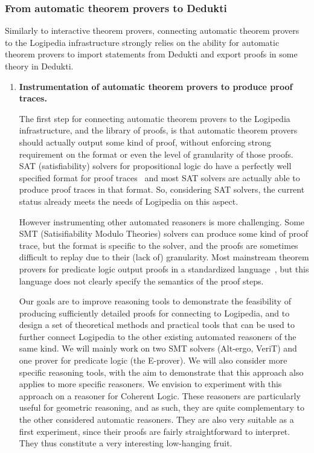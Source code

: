\subsubsection*{From automatic theorem provers to Dedukti}

Similarly to interactive theorem provers, connecting automatic theorem
provers to the Logipedia infra\-struc\-ture strongly relies on the ability
for automatic theorem provers to import statements from Dedukti and
export proofs in some theory in Dedukti.

\begin{enumerate}[\bf(a)]
\item{\bf Instrumentation of automatic theorem provers to produce proof traces.}

  The first step for connecting automatic theorem provers to the
Logipedia infrastructure, and the library of proofs, is that automatic
theorem provers should actually output some kind of proof, without
enforcing strong requirement on the format or even the level of
granularity of those proofs.  SAT (satisfiability) solvers for
propositional logic do have a perfectly well specified format for
proof traces~\cite{DBLP:conf/sat/WetzlerHH14} and most SAT solvers are actually able to
produce proof traces in that format.  So, considering SAT solvers, the
current status already meets the needs of Logipedia on this aspect.

However instrumenting other automated reasoners is more challenging.
Some SMT (Satisifiability Modulo
Theories) solvers can produce some kind of proof trace, but the format
is specific to the solver, and the proofs are sometimes difficult to
replay due to their (lack of) granularity.  Most mainstream theorem provers for
predicate logic output proofs in a standardized language~\cite{DBLP:conf/csr/Sutcliffe07},
but this language does not clearly specify the semantics of the proof
steps.

Our goals are to improve reasoning tools to demonstrate the feasibility of
producing sufficiently detailed proofs for connecting to Logipedia, and to
design a set of theoretical methods and practical tools that can be used to
further connect Logipedia to the other existing automated reasoners of the same
kind.  We will mainly work on two SMT solvers (Alt-ergo, VeriT) and one prover
for predicate logic (the E-prover).  We will also consider more specific
reasoning tools, with the aim to demonstrate that this approach also applies to
more specific reasoners.  We envision to experiment with this approach on a
reasoner for Coherent Logic.  These reasoners are particularly useful for
geometric reasoning, and as such, they are quite complementary to the other
considered automatic reasoners.  They are also very suitable as a first
experiment, since their proofs are fairly straightforward to interpret.  They
thus constitute a very interesting low-hanging fruit.


\end{enumerate}
